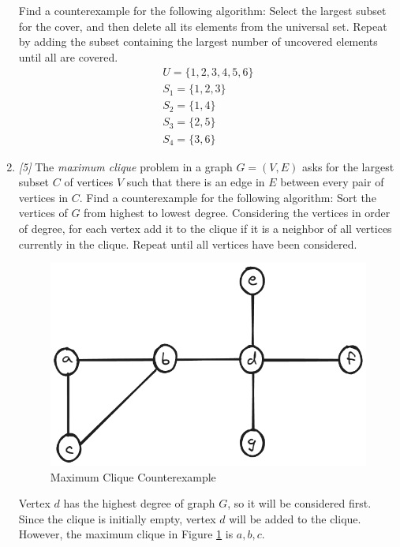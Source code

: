 \documentclass[10pt, letterpaper]{article}
\numberwithin{equation}{section}
\begin{document}
\begin{enumerate}
        Find a counterexample for the following algorithm: Select the largest subset for the cover,
        and then delete all its elements from the universal set. Repeat by adding the subset
        containing the largest number of uncovered elements until all are covered.
        \begin{gather*}
            U = \{1, 2, 3, 4, 5, 6\} \\
            S_1 = \{1, 2, 3\} \\
            S_2 = \{1, 4\} \\
            S_3 = \{2, 5\} \\
            S_4 = \{3, 6\}
        \end{gather*}

        \item \textit{[5]} The \textit{maximum clique} problem in a graph $G = (V, E)$ asks for the
        largest subset $C$ of vertices $V$ such that there is an edge in $E$ between every pair of
        vertices in $C$. Find a counterexample for the following algorithm: Sort the vertices of $G$
        from highest to lowest degree. Considering the vertices in order of degree, for each vertex
        add it to the clique if it is a neighbor of all vertices currently in the clique. Repeat
        until all vertices have been considered.

        \begin{figure}[H]
            \centering
            \includegraphics[scale=0.25]{01-07.png}
            \caption{Maximum Clique Counterexample}
            \label{fig:max-clique}
        \end{figure}

        Vertex $d$ has the highest degree of graph $G$, so it will be considered first. Since the
        clique is initially empty, vertex $d$ will be added to the clique. However, the maximum
        clique in Figure \ref{fig:max-clique} is $a, b, c$.


\end{enumerate}
\end{document}
